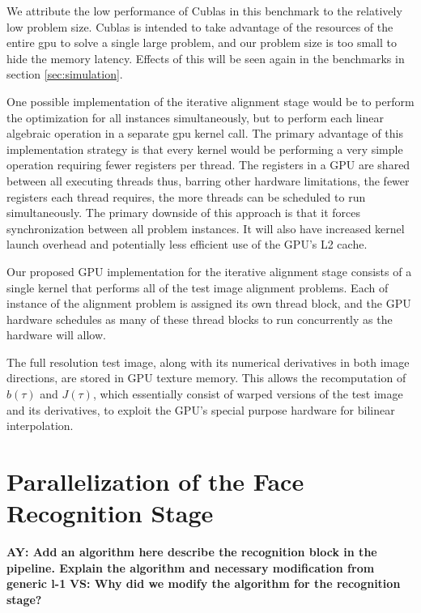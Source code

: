 \documentclass[10pt,twocolumn,letterpaper]{article}
\begin{document}
We attribute the low performance of Cublas in this benchmark to the relatively
low problem size. Cublas is intended to take advantage of the resources of the
entire gpu to solve a single large problem, and our problem size is too small
to hide the memory latency.  Effects of this will be seen again in the
benchmarks in section \ref{sec:simulation}.

One possible implementation of the iterative alignment stage would be to
perform the optimization for all instances simultaneously, but to perform each
linear algebraic operation in a separate gpu kernel call.  The primary
advantage of this implementation strategy is that every kernel would be
performing a very simple operation requiring fewer registers per thread.  The
registers in a GPU are shared between all executing threads thus, barring other
hardware limitations, the fewer registers each thread requires, the more
threads can be scheduled to run simultaneously.  The primary downside of this
approach is that it forces synchronization between all problem instances.  It will
also have increased kernel launch overhead and potentially less efficient use of
the GPU's L2 cache.

Our proposed GPU implementation for the iterative alignment stage consists of a
single kernel that performs all of the test image alignment problems.  Each of
instance of the alignment problem is assigned its own thread block, and the GPU
hardware schedules as many of these thread blocks to run concurrently as the 
hardware will allow.  

The full resolution test image, along with its numerical derivatives in both
image directions, are stored in GPU texture memory. This  allows the
recomputation of $b(\tau)$ and $J(\tau)$, which essentially consist of warped
versions of the test image and its derivatives, to exploit the GPU's special
purpose hardware for bilinear interpolation.


\section{Parallelization of the Face Recognition Stage}
\label{sec:recognition}
{\bf AY: Add an algorithm here describe the recognition block in the pipeline. Explain the algorithm and necessary modification from generic l-1}
{\bf VS: Why did we modify the algorithm for the recognition stage? }
\end{document}
